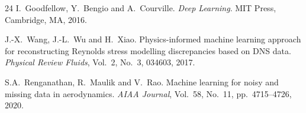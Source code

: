\documentclass{WCCM-ECCOMAS_2026_Full_Paper}
\begin{document}
\begin{thebibliography}{24}
I.~Goodfellow, Y.~Bengio and A.~Courville.
\textit{Deep Learning}.
MIT Press, Cambridge, MA, 2016.

J.-X.~Wang, J.-L.~Wu and H.~Xiao.
Physics-informed machine learning approach for reconstructing
Reynolds stress modelling discrepancies based on DNS data.
\textit{Physical Review Fluids}, Vol.~2, No.~3, 034603, 2017.

S.A.~Renganathan, R.~Maulik and V.~Rao.
Machine learning for noisy and missing data in aerodynamics.
\textit{AIAA Journal}, Vol.~58, No.~11, pp.~4715--4726, 2020.

\end{thebibliography}
\end{document}
